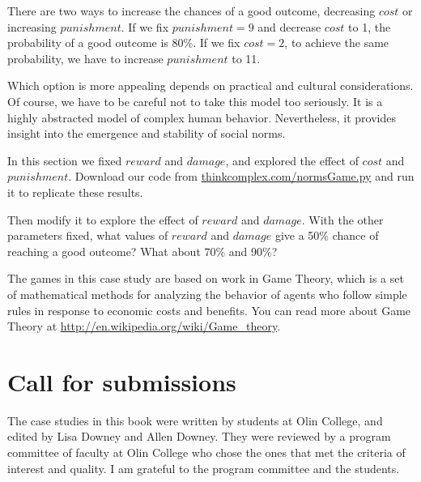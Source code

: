\documentclass[10pt]{book}
\begin{document}

There are two ways to increase the chances of a good outcome,
decreasing $cost$ or increasing $punishment$.  If we fix
$punishment=9$ and decrease $cost$ to 1, the probability of a good
outcome is 80\%.  If we fix $cost=2$, to achieve the same probability,
we have to increase $punishment$ to 11.

Which option is more appealing depends on practical and cultural
considerations.  Of course, we have to be careful not to take this
model too seriously.  It is a highly abstracted model of complex human
behavior.  Nevertheless, it provides insight into the emergence
and stability of social norms.

\begin{exercise}

In this section we fixed $reward$ and $damage$, and explored the
effect of $cost$ and $punishment$.
Download our code from \url{thinkcomplex.com/normsGame.py} and
run it to replicate these results.

Then modify it to explore the effect of $reward$ and $damage$.  With
the other parameters fixed, what values of $reward$ and $damage$ give
a 50\% chance of reaching a good outcome?  What about 70\% and 90\%?
\end{exercise}

\begin{exercise}

The games in this case study are based on work in
Game Theory, which is a set of mathematical methods for analyzing the
behavior of agents who follow simple rules in response to economic
costs and benefits.  You can read more about Game Theory at
\url{http://en.wikipedia.org/wiki/Game_theory}.
\end{exercise}



\appendix

\chapter{Call for submissions}
\label{submissions}

The case studies in this book were written by students at Olin
College, and edited by Lisa Downey and Allen Downey.  They
were reviewed by a program committee of faculty at Olin College
who chose the ones that met the criteria of interest and quality.
I am grateful to the program committee and the students.
\end{document}
